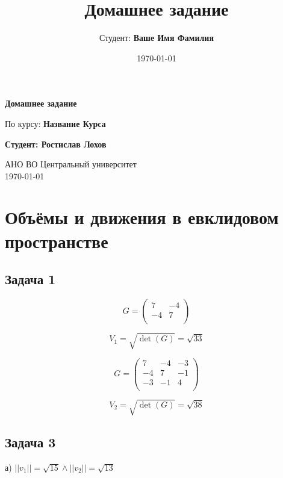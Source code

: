 \documentclass[a4paper,12pt]{article}
\title{Домашнее задание}
\author{Студент: \textbf{Ваше Имя Фамилия}}
\date{\today}
\begin{document}
\begin{titlepage}
    \centering
    \vspace*{1cm}

    \Huge
    \textbf{Домашнее задание}

    \vspace{0.5cm}
    \LARGE
    По курсу: \textbf{Название Курса}

    \vspace{1.5cm}

    \textbf{Студент: Ростислав Лохов}

    \vfill

    \Large
    АНО ВО Центральный университет\\
    \vspace{0.3cm}
    \today

\end{titlepage}

\tableofcontents
\newpage

\section{Объёмы и движения в евклидовом пространстве}

\subsection{Задача 1}

\[
G = \begin{pmatrix}
    7 & -4 \\
    -4 & 7 \\
\end{pmatrix}
\]

\[
V_1 = \sqrt{\det(G)} = \sqrt{33}
\]

\[
G = \begin{pmatrix}
    7 & -4 & -3 \\
    -4 & 7 & -1 \\
    -3 & -1 & 4 \\
\end{pmatrix}
\]

\[
V_2 = \sqrt{\det(G)} = \sqrt{38}
\]

\subsection{Задача 3}

а) \( ||v_1|| = \sqrt{15} \land ||v_2|| = \sqrt{13} \)
\end{document}
